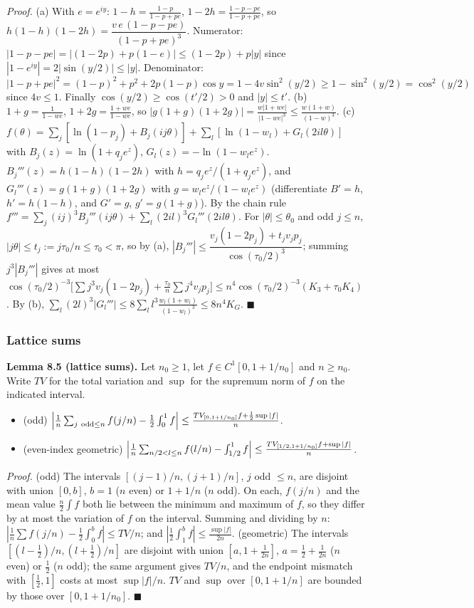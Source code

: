 \emph{Proof.} (a) With \(e=e^{iy}\): \(1-h=\frac{1-p}{1-p+pe}\), \(1-2h=\frac{1-p-pe}{1-p+pe}\), so \(h(1-h)(1-2h)=\dfrac{v\,e\,(1-p-pe)}{(1-p+pe)^3}\). Numerator: \(|1-p-pe|=|(1-2p)+p(1-e)|\le(1-2p)+p|y|\) since \(|1-e^{iy}|=2|\sin(y/2)|\le|y|\). Denominator: \(|1-p+pe|^2=(1-p)^2+p^2+2p(1-p)\cos y=1-4v\sin^2(y/2)\ge1-\sin^2(y/2)=\cos^2(y/2)\) since \(4v\le1\). Finally \(\cos(y/2)\ge\cos(t'/2)>0\) and \(|y|\le t'\).
(b) \(1+g=\frac1{1-we}\), \(1+2g=\frac{1+we}{1-we}\), so \(|g(1+g)(1+2g)|=\frac{w|1+we|}{|1-we|^3}\le\frac{w(1+w)}{(1-w)^3}\).
(c) \(f(\theta)=\sum_j[\ln(1-p_j)+B_j(ij\theta)]+\sum_l[\ln(1-w_l)+G_l(2il\theta)]\) with \(B_j(z)=\ln(1+q_je^z)\), \(G_l(z)=-\ln(1-w_le^z)\). \(B_j'''(z)=h(1-h)(1-2h)\) with \(h=q_je^z/(1+q_je^z)\), and \(G_l'''(z)=g(1+g)(1+2g)\) with \(g=w_le^z/(1-w_le^z)\) (differentiate \(B'=h\), \(h'=h(1-h)\), and \(G'=g\), \(g'=g(1+g)\)). By the chain rule \(f'''=\sum_j(ij)^3B_j'''(ij\theta)+\sum_l(2il)^3G_l'''(2il\theta)\). For \(|\theta|\le\theta_0\) and odd \(j\le n\), \(|j\theta|\le t_j:=j\tau_0/n\le\tau_0<\pi\), so by (a), \(|B_j'''|\le\dfrac{v_j(1-2p_j)+t_jv_jp_j}{\cos(\tau_0/2)^3}\); summing \(j^3|B_j'''|\) gives at most \(\cos(\tau_0/2)^{-3}\bigl[\sum j^3v_j(1-2p_j)+\frac{\tau_0}{n}\sum j^4v_jp_j\bigr]\le n^4\cos(\tau_0/2)^{-3}(K_3+\tau_0K_4)\). By (b), \(\sum_l(2l)^3|G_l'''|\le8\sum_ll^3\frac{w_l(1+w_l)}{(1-w_l)^3}\le8n^4K_G\). \(\blacksquare\)

\subsubsection{Lattice sums}\label{lattice-sums}

\textbf{Lemma 8.5 (lattice sums).} Let \(n_0\ge1\), let \(f\in C^1[0,1+1/n_0]\) and \(n\ge n_0\). Write \(TV\) for the total variation and \(\sup\) for the supremum norm of \(f\) on the indicated interval.

\begin{itemize}
\tightlist
\item
  (odd) \(\Bigl|\frac1n\sum_{j\ \mathrm{odd}\le n}f(j/n)-\frac12\int_0^1f\Bigr|\le\frac{TV_{[0,1+1/n_0]}f+\frac12\sup|f|}{n}\).
\item
  (even-index geometric) \(\Bigl|\frac1n\sum_{n/2<l\le n}f(l/n)-\int_{1/2}^1f\Bigr|\le\frac{TV_{[1/2,1+1/n_0]}f+\sup|f|}{n}\).
\end{itemize}

\emph{Proof.} (odd) The intervals \([(j-1)/n,(j+1)/n]\), \(j\) odd \(\le n\), are disjoint with union \([0,b]\), \(b=1\) (\(n\) even) or \(1+1/n\) (\(n\) odd). On each, \(f(j/n)\) and the mean value \(\frac n2\int f\) both lie between the minimum and maximum of \(f\), so they differ by at most the variation of \(f\) on the interval. Summing and dividing by \(n\): \(|\frac1n\sum f(j/n)-\frac12\int_0^bf|\le TV/n\); and \(|\frac12\int_1^bf|\le\frac{\sup|f|}{2n}\). (geometric) The intervals \([(l-\frac12)/n,(l+\frac12)/n]\) are disjoint with union \([a,1+\frac1{2n}]\), \(a=\frac12+\frac1{2n}\) (\(n\) even) or \(\frac12\) (\(n\) odd); the same argument gives \(TV/n\), and the endpoint mismatch with \([\frac12,1]\) costs at most \(\sup|f|/n\). \(TV\) and \(\sup\) over \([0,1+1/n]\) are bounded by those over \([0,1+1/n_0]\). \(\blacksquare\)

